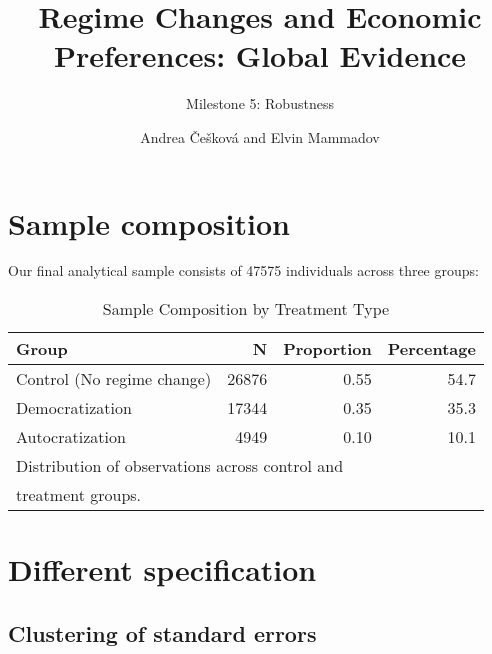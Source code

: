 \documentclass[
  letterpaper,
  DIV=11,
  numbers=noendperiod]{scrartcl}
\title{Regime Changes and Economic Preferences: Global Evidence}
\subtitle{Milestone 5: Robustness}
\author{Andrea Češková and Elvin Mammadov}
\date{}
\renewcommand*\contentsname{Table of contents}
\newcommand\contentsname{Table of contents}
\begin{document}
\maketitle
\ifdefined\Shaded\renewenvironment{Shaded}{\begin{tcolorbox}[interior hidden, borderline west={3pt}{0pt}{shadecolor}, frame hidden, breakable, enhanced, sharp corners, boxrule=0pt]}{\end{tcolorbox}}\fi

\renewcommand*\contentsname{Table of contents}
{
\hypersetup{linkcolor=}
\setcounter{tocdepth}{3}
\tableofcontents
}
\hypertarget{sample-composition}{%
\section{Sample composition}\label{sample-composition}}

Our final analytical sample consists of 47575 individuals across three
groups:

\hypertarget{tbl-samplecomp}{}
\begin{table}
\caption{\label{tbl-samplecomp}Sample Composition by Treatment Type }\tabularnewline

\centering
\begin{tabular}{l|r|r|r}
\hline
Group & N & Proportion & Percentage\\
\hline
Control (No regime change) & 26876 & 0.55 & 54.7\\
\hline
Democratization & 17344 & 0.35 & 35.3\\
\hline
Autocratization & 4949 & 0.10 & 10.1\\
\hline
\multicolumn{4}{l}{\textsuperscript{} Distribution of observations across control and}\\
\multicolumn{4}{l}{treatment groups.}\\
\end{tabular}
\end{table}

\hypertarget{different-specification}{%
\section{Different specification}\label{different-specification}}

\hypertarget{clustering-of-standard-errors}{%
\subsection{Clustering of standard
errors}\label{clustering-of-standard-errors}}
\end{document}
